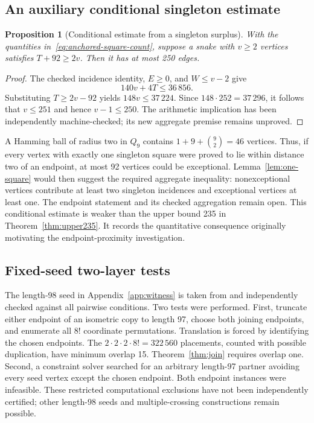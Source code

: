\documentclass[11pt,a4paper]{article}
\newtheorem{proposition}[theorem]{Proposition}
\theoremstyle{definition}
\theoremstyle{remark}
\newcommand{\Q}{Q}
\begin{document}
\subsection{An auxiliary conditional singleton estimate}
\begin{proposition}[Conditional estimate from a singleton surplus]
With the quantities in~\eqref{eq:anchored-square-count}, suppose a snake with $v\ge2$ vertices satisfies $T+92\ge2v$. Then it has at most 250 edges.
\end{proposition}
\begin{proof}
The checked incidence identity, $E\ge0$, and $W\le v-2$ give
\[
140v+4T\le36\,856.
\]
Substituting $T\ge2v-92$ yields $148v\le37\,224$. Since $148\cdot252=37\,296$, it follows that $v\le251$ and hence $v-1\le250$. The arithmetic implication has been independently machine-checked; its new aggregate premise remains unproved.
\end{proof}
A Hamming ball of radius two in $\Q_9$ contains $1+9+\binom92=46$ vertices. Thus, if every vertex with exactly one singleton square were proved to lie within distance two of an endpoint, at most 92 vertices could be exceptional. Lemma~\ref{lem:one-square} would then suggest the required aggregate inequality: nonexceptional vertices contribute at least two singleton incidences and exceptional vertices at least one. The endpoint statement and its checked aggregation remain open. This conditional estimate is weaker than the upper bound 235 in Theorem~\ref{thm:upper235}. It records the quantitative consequence originally motivating the endpoint-proximity investigation.

\subsection{Fixed-seed two-layer tests}
The length-98 seed in Appendix~\ref{app:witness} is taken from \cite{records} and independently checked against all pairwise conditions. Two tests were performed. First, truncate either endpoint of an isometric copy to length 97, choose both joining endpoints, and enumerate all $8!$ coordinate permutations. Translation is forced by identifying the chosen endpoints. The $2\cdot2\cdot2\cdot8!=322\,560$ placements, counted with possible duplication, have minimum overlap 15. Theorem~\ref{thm:join} requires overlap one. Second, a constraint solver searched for an arbitrary length-97 partner avoiding every seed vertex except the chosen endpoint. Both endpoint instances were infeasible. These restricted computational exclusions have not been independently certified; other length-98 seeds and multiple-crossing constructions remain possible.
\end{document}
